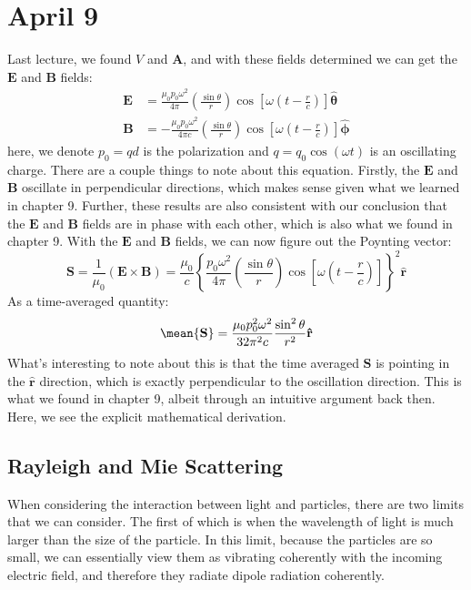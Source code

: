 \section{April 9}
Last lecture, we found \( V \) and \( \mathbf{A} \), and with these fields determined we can get the \(
\mathbf{E} \) and \( \mathbf{B} \) fields:
\begin{align*}
	\mathbf{E} &= \frac{\mu_0 p_0 \omega^2}{4\pi} \left( \frac{\sin \theta}{r} \right)\cos\left[ \omega\left(
		t - \frac{r}{c}\right) \right] \boldsymbol{\hat{\theta}}\\
	\mathbf{B} &= - \frac{\mu_0 p_0 \omega^2}{4\pi c} \left( \frac{\sin \theta}{r} \right) \cos \left[
		\omega\left( t - \frac{r}{c} \right) \right] \boldsymbol{\hat{\phi}}
\end{align*}
here, we denote \( p_0 = qd \) is the polarization and \( q = q_0 \cos (\omega t) \) is an oscillating
charge. There are a couple things to note about this equation. Firstly, the \( \mathbf{E} \) and \(
\mathbf{B} \) oscillate in perpendicular directions, which makes sense given what we learned in chapter 9.
Further, these results are also consistent with our conclusion that the \( \mathbf{E} \) and \( \mathbf{B} \)
fields are in phase with each other, which is also what we found in chapter 9. With the \( \mathbf{E} \) and
\( \mathbf{B} \) fields, we can now figure out the Poynting vector:
\[
	\mathbf{S} = \frac{1}{\mu_0}(\mathbf{E} \times \mathbf{B}) = \frac{\mu_0}{c}\left\{ \frac{p_0
	\omega^2}{4\pi}\left( \frac{\sin \theta}{r} \right)\cos\left[ \omega\left( t - \frac{r}{c} \right)
\right] \right\}^2 \mathbf{\hat{r}}
\]
As a time-averaged quantity:
\[
	\mean{\mathbf{S}} = \frac{\mu_0 p_0^2 \omega^2}{32 \pi^2 c} \frac{\sin^2 \theta}{r^2}\mathbf{\hat{r}}
\]
What's interesting to note about this is that the time averaged \( \mathbf{S} \) is pointing in the \(
\mathbf{\hat{r}} \) direction, which is exactly perpendicular to the oscillation direction. This is what we
found in chapter 9, albeit through an intuitive argument back then. Here, we see the explicit mathematical
derivation.  

\subsection{Rayleigh and Mie Scattering}
When considering the interaction between light and particles, there are two limits that we can consider. The
first of which is when the wavelength of light is much larger than the size of the particle. In this limit,
because the particles are so small, we can essentially view them as vibrating coherently with the incoming
electric field, and therefore they radiate dipole radiation coherently. 


